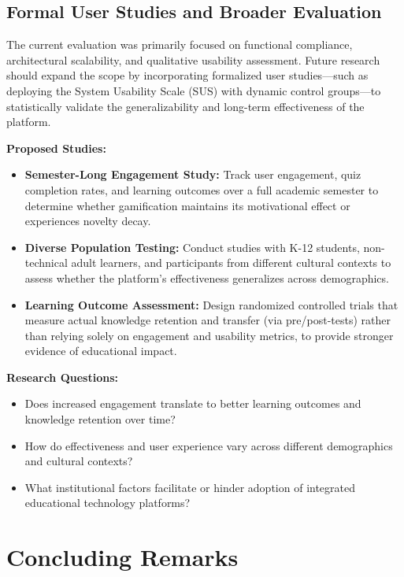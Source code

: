 \subsection{Formal User Studies and Broader Evaluation}

The current evaluation was primarily focused on functional compliance, architectural scalability, and qualitative usability assessment. Future research should expand the scope by incorporating formalized user studies—such as deploying the System Usability Scale (SUS) with dynamic control groups—to statistically validate the generalizability and long-term effectiveness of the platform.

\textbf{Proposed Studies:}
\begin{itemize}
    \item \textbf{Semester-Long Engagement Study:} Track user engagement, quiz completion rates, and learning outcomes over a full academic semester to determine whether gamification maintains its motivational effect or experiences novelty decay.
    
    \item \textbf{Diverse Population Testing:} Conduct studies with K-12 students, non-technical adult learners, and participants from different cultural contexts to assess whether the platform's effectiveness generalizes across demographics.
    
    \item \textbf{Learning Outcome Assessment:} Design randomized controlled trials that measure actual knowledge retention and transfer (via pre/post-tests) rather than relying solely on engagement and usability metrics, to provide stronger evidence of educational impact.
\end{itemize}

\textbf{Research Questions:}
\begin{itemize}
    \item Does increased engagement translate to better learning outcomes and knowledge retention over time?
    \item How do effectiveness and user experience vary across different demographics and cultural contexts?
    \item What institutional factors facilitate or hinder adoption of integrated educational technology platforms?
\end{itemize}

\section{Concluding Remarks}
\label{sec:concluding-remarks}

